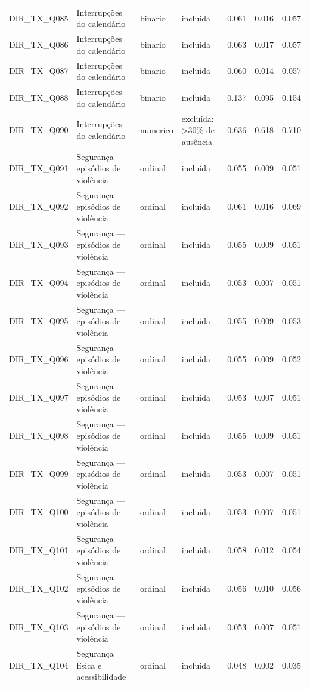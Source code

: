 \begin{tabular}{llllrrr}
DIR\_TX\_Q085 & Interrupções do calendário & binario & incluída & 0.061 & 0.016 & 0.057 \\
DIR\_TX\_Q086 & Interrupções do calendário & binario & incluída & 0.063 & 0.017 & 0.057 \\
DIR\_TX\_Q087 & Interrupções do calendário & binario & incluída & 0.060 & 0.014 & 0.057 \\
DIR\_TX\_Q088 & Interrupções do calendário & binario & incluída & 0.137 & 0.095 & 0.154 \\
DIR\_TX\_Q090 & Interrupções do calendário & numerico & excluída: >30\% de ausência & 0.636 & 0.618 & 0.710 \\
DIR\_TX\_Q091 & Segurança — episódios de violência & ordinal & incluída & 0.055 & 0.009 & 0.051 \\
DIR\_TX\_Q092 & Segurança — episódios de violência & ordinal & incluída & 0.061 & 0.016 & 0.069 \\
DIR\_TX\_Q093 & Segurança — episódios de violência & ordinal & incluída & 0.055 & 0.009 & 0.051 \\
DIR\_TX\_Q094 & Segurança — episódios de violência & ordinal & incluída & 0.053 & 0.007 & 0.051 \\
DIR\_TX\_Q095 & Segurança — episódios de violência & ordinal & incluída & 0.055 & 0.009 & 0.053 \\
DIR\_TX\_Q096 & Segurança — episódios de violência & ordinal & incluída & 0.055 & 0.009 & 0.052 \\
DIR\_TX\_Q097 & Segurança — episódios de violência & ordinal & incluída & 0.053 & 0.007 & 0.051 \\
DIR\_TX\_Q098 & Segurança — episódios de violência & ordinal & incluída & 0.055 & 0.009 & 0.051 \\
DIR\_TX\_Q099 & Segurança — episódios de violência & ordinal & incluída & 0.053 & 0.007 & 0.051 \\
DIR\_TX\_Q100 & Segurança — episódios de violência & ordinal & incluída & 0.053 & 0.007 & 0.051 \\
DIR\_TX\_Q101 & Segurança — episódios de violência & ordinal & incluída & 0.058 & 0.012 & 0.054 \\
DIR\_TX\_Q102 & Segurança — episódios de violência & ordinal & incluída & 0.056 & 0.010 & 0.056 \\
DIR\_TX\_Q103 & Segurança — episódios de violência & ordinal & incluída & 0.053 & 0.007 & 0.051 \\
DIR\_TX\_Q104 & Segurança física e acessibilidade & ordinal & incluída & 0.048 & 0.002 & 0.035 \\

\end{tabular}
